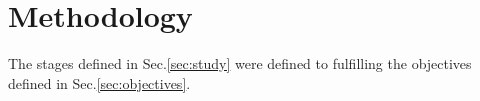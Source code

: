 \section{Methodology}
\label{sec:methodology}

The stages defined in Sec.\ref{sec:study} were defined to fulfilling the objectives defined in Sec.\ref{sec:objectives}. 